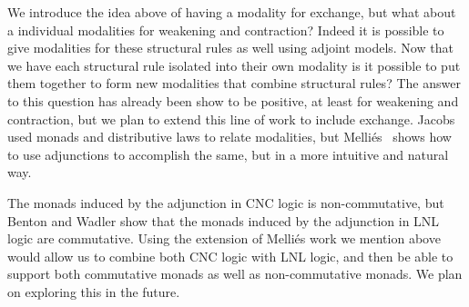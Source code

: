 We introduce the idea above of having a modality for exchange, but
what about a individual modalities for weakening and contraction?
Indeed it is possible to give modalities for these structural rules as
well using adjoint models.  Now that we have each structural rule
isolated into their own modality is it possible to put them together
to form new modalities that combine structural rules?  The answer to
this question has already been show to be positive, at least for
weakening and contraction, but we plan to extend this line of work to
include exchange.  Jacobs~\cite{JACOBS199473} used monads and
distributive laws to relate modalities, but
Melli{\'e}s~\cite{Mellies:2004} shows how to use adjunctions to
accomplish the same, but in a more intuitive and natural way.

The monads induced by the adjunction in CNC logic is non-commutative,
but Benton and Wadler show that the monads induced by the adjunction
in LNL logic \cite{Benton:1996} are commutative.  Using the extension
of Melli{\'e}s work we mention above would allow us to combine both
CNC logic with LNL logic, and then be able to support both commutative
monads as well as non-commutative monads.  We plan on exploring this
in the future.
